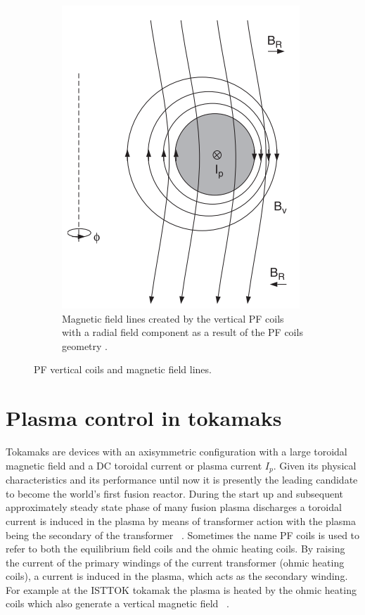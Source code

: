 \begin{figure}
\begin{subfigure}[b]{0.39\textwidth}
  		\includegraphics[width=\textwidth]{Chp1/horizontalField.png}
  		\caption{ Magnetic field lines created by the vertical PF coils with a radial field component as a result of the PF coils geometry \cite[Chapter~4]{Zohm2015}. \label{}    }
  	\end{subfigure}
  	\caption{ PF vertical coils and magnetic field lines.\label{PFcoils} }
  \end{figure}
  
  
  
\section{Plasma control in tokamaks}

Tokamaks are devices with an axisymmetric configuration with a large toroidal magnetic field and a DC toroidal current or plasma current $I_p$. Given its physical characteristics and its performance until now it is presently the leading candidate to become the world’s first fusion reactor. During the start up and subsequent approximately steady state phase of many fusion plasma discharges a toroidal current is induced in the plasma by means of transformer action with the plasma being the secondary of the transformer  ~\cite[Chapter~9]{Freidberg2007}. Sometimes the name PF coils is used to refer to  both the equilibrium field coils and the ohmic heating coils. By raising the current of the primary windings of the current transformer (ohmic heating coils), a current is induced in the plasma, which acts as the secondary winding. For example at the ISTTOK tokamak the plasma is heated by the ohmic heating coils which also generate a vertical magnetic field ~\cite[Chapter~16]{Miyamoto2011}. \smallskip

